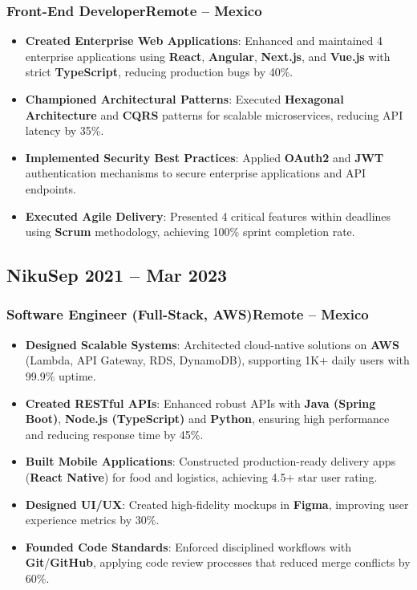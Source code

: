 \documentclass[a4paper,10pt]{article}
\newcommand{\kw}[1]{\textbf{\textcolor{keyword}{#1}}}
\newcommand{\tech}[1]{\textbf{\textcolor{tech}{#1}}}
\begin{document}
\subsubsection*{\small Front-End Developer\hfill Remote -- Mexico}
\begin{itemize}[noitemsep, leftmargin=*]
    \item \textbf{Created Enterprise Web Applications}: Enhanced and maintained 4 enterprise applications using \tech{React}, \tech{Angular}, \tech{Next.js}, and \tech{Vue.js} with strict \tech{TypeScript}, reducing production bugs by 40\%.
    \item \textbf{Championed Architectural Patterns}: Executed \kw{Hexagonal Architecture} and \kw{CQRS} patterns for scalable microservices, reducing API latency by 35\%.
    \item \textbf{Implemented Security Best Practices}: Applied \kw{OAuth2} and \kw{JWT} authentication mechanisms to secure enterprise applications and API endpoints.
    \item \textbf{Executed Agile Delivery}: Presented 4 critical features within deadlines using \kw{Scrum} methodology, achieving 100\% sprint completion rate.
\end{itemize}

\subsection*{\small Niku\hfill\textbf{Sep 2021 -- Mar 2023}}
\subsubsection*{\small Software Engineer (Full-Stack, AWS)\hfill Remote -- Mexico}
\begin{itemize}[noitemsep, leftmargin=*]
    \item \textbf{Designed Scalable Systems}: Architected cloud-native solutions on \tech{AWS} (Lambda, API Gateway, RDS, DynamoDB), supporting 1K+ daily users with 99.9\% uptime.
    \item \textbf{Created RESTful APIs}: Enhanced robust APIs with \tech{Java (Spring Boot)}, \tech{Node.js (TypeScript)} and \tech{Python}, ensuring high performance and reducing response time by 45\%.
    \item \textbf{Built Mobile Applications}: Constructed production-ready delivery apps (\tech{React Native}) for food and logistics, achieving 4.5+ star user rating.
    \item \textbf{Designed UI/UX}: Created high-fidelity mockups in \tech{Figma}, improving user experience metrics by 30\%.
    \item \textbf{Founded Code Standards}: Enforced disciplined workflows with \tech{Git}/\tech{GitHub}, applying code review processes that reduced merge conflicts by 60\%.
\end{itemize}
\end{document}
